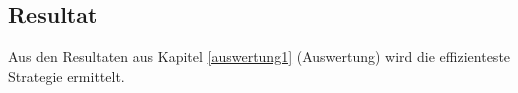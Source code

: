 \documentclass[12pt,a4paper]{scrartcl}
\begin{document}

\subsection{Resultat}
Aus den Resultaten aus Kapitel \ref{auswertung1} (Auswertung) wird die effizienteste Strategie ermittelt. \newline
\end{document}
